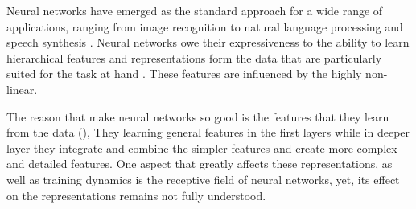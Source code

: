 ﻿%
%
%
%

Neural networks have emerged as the standard approach for a wide range of applications, ranging from image recognition
\citep{dengImageNetLargescaleHierarchical2009} to natural language processing \citep{devlinBERTPretrainingDeep2019} and speech synthesis
\citep{oordWaveNetGenerativeModel2016,lecunDeepLearning2015}.
Neural networks owe their expressiveness to the ability to learn hierarchical features and representations form the data
that are particularly suited for the task at hand \citep{goodfellowDeepLearning2016}. These features are influenced by
the highly non-linear.



The reason that make neural networks so good is the features that they learn from the data
(\citep{zhouObjectDetectorsEmerge2015}),
They learning general features in the first layers while in deeper layer they integrate and combine the simpler features and create
more complex and detailed features. One aspect that greatly affects these representations, as well as training dynamics is the receptive field of
neural networks, yet, its effect on the representations remains not fully understood.


